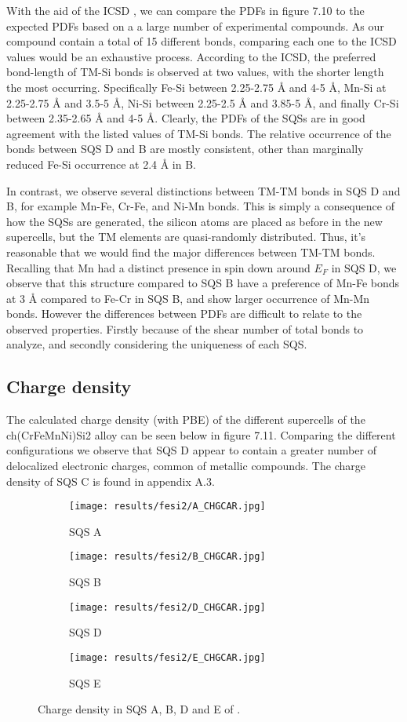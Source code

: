 With the aid of the ICSD \cite{icsd}, we can compare the PDFs in figure 7.10 to the expected PDFs based on a a large number of experimental compounds. As our compound contain a total of 15 different bonds, comparing each one to the ICSD values would be an exhaustive process. According to the ICSD, the preferred bond-length of TM-Si bonds is observed at two values, with the shorter length the most occurring. Specifically Fe-Si between 2.25-2.75 Å and 4-5 Å, Mn-Si at 2.25-2.75 Å and 3.5-5 Å, Ni-Si between 2.25-2.5 Å and 3.85-5 Å, and finally Cr-Si between 2.35-2.65 Å and 4-5 Å. Clearly, the PDFs of the SQSs are in good agreement with the listed values of TM-Si bonds. The relative occurrence of the bonds between SQS D and B are mostly consistent, other than marginally reduced Fe-Si occurrence at 2.4 Å in B.

In contrast, we observe several distinctions between TM-TM bonds in SQS D and B, for example Mn-Fe, Cr-Fe, and Ni-Mn bonds. This is simply a consequence of how the SQSs are generated, the silicon atoms are placed as before in the new supercells, but the TM elements are quasi-randomly distributed. Thus, it's reasonable that we would find the major differences between TM-TM bonds. Recalling that Mn had a distinct presence in spin down around $E_F$ in SQS D, we observe that this structure compared to SQS B have a preference of Mn-Fe bonds at 3 Å compared to Fe-Cr in SQS B, and show larger occurrence of Mn-Mn bonds. However the differences between PDFs are difficult to relate to the observed properties. Firstly because of the shear number of total bonds to analyze, and secondly considering the uniqueness of each SQS.

\subsection{Charge density}
The calculated charge density (with PBE) of the different supercells of the ch{(CrFeMnNi)Si2} alloy can be seen below in figure 7.11. Comparing the different configurations we observe that SQS D appear to contain a greater number of delocalized electronic charges, common of metallic compounds. The charge density of SQS C is found in appendix A.3. 

\begin{figure}[H]
\begin{subfigure}{.5\textwidth}
\texttt{[image: results/fesi2/A\_CHGCAR.jpg]}
\caption{SQS A}
\end{subfigure}
\begin{subfigure}{.5\textwidth}
\texttt{[image: results/fesi2/B\_CHGCAR.jpg]}
\caption{SQS B}
\end{subfigure}
\begin{subfigure}{.5\textwidth}
\texttt{[image: results/fesi2/D\_CHGCAR.jpg]}
\caption{SQS D}
\end{subfigure}
\begin{subfigure}{.5\textwidth}
\texttt{[image: results/fesi2/E\_CHGCAR.jpg]}
\caption{SQS E}
\end{subfigure}
\caption{Charge density in SQS A, B, D and E of .}
\end{figure}


